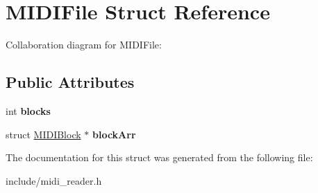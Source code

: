 \hypertarget{structMIDIFile}{\section{M\-I\-D\-I\-File Struct Reference}
\label{structMIDIFile}
}


Collaboration diagram for M\-I\-D\-I\-File\-:
\subsection*{Public Attributes}
\begin{DoxyCompactItemize}
\item 
\hypertarget{structMIDIFile_a5880ed51bf399a3ff8f98fefae41d3d8}{int {\bfseries blocks}}\label{structMIDIFile_a5880ed51bf399a3ff8f98fefae41d3d8}

\item 
\hypertarget{structMIDIFile_ad24509ca8b3a778bb669de20c7792fbc}{struct \hyperlink{structMIDIBlock}{M\-I\-D\-I\-Block} $\ast$ {\bfseries block\-Arr}}\label{structMIDIFile_ad24509ca8b3a778bb669de20c7792fbc}

\end{DoxyCompactItemize}


The documentation for this struct was generated from the following file\-:\begin{DoxyCompactItemize}
\item 
include/midi\-\_\-reader.\-h\end{DoxyCompactItemize}
